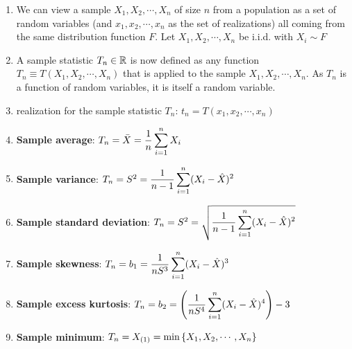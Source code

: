\begin{enumerate}
    \item We can view a sample $X_1 , X_2 , \cdots, X _n$ of size $n$ from a population as a set of random variables (and $x_1 , x_2, \cdots , x _n$ as the set of realizations) all coming from the same distribution function $F$.
    Let $X_1 , X_2, \cdots , X _n$ be i.i.d. with $X _i \sim F$
    \hfill \cite{statistics/book/Statistics-for-Data-Scientists/Maurits-Kaptein}

    \item A sample statistic $T_n \in \mathbb{R}$ is now defined as any function $T_n \equiv T (X_1, X_2, \cdots , X _n )$ that is applied to the sample $X_1 , X_2, \cdots , X _n$.
    As $T_n$ is a function of random variables, it is itself a random variable.
    \hfill \cite{statistics/book/Statistics-for-Data-Scientists/Maurits-Kaptein}

    \item realization for the sample statistic $T_n$: $t _n = T (x_1, x_2, \cdots , x _n )$
    \hfill \cite{statistics/book/Statistics-for-Data-Scientists/Maurits-Kaptein}

    \item \textbf{Sample average}: $T_n = \bar{X} = \dfrac{1}{n}\displaystyle\sum^n _{i=1} X _i$
    \hfill \cite{statistics/book/Statistics-for-Data-Scientists/Maurits-Kaptein}

    \item \textbf{Sample variance}: $T_n = S^2 = \dfrac{1}{n - 1} \displaystyle\sum^n _{i=1}(X _i - \hat{X})^2$
    \hfill \cite{statistics/book/Statistics-for-Data-Scientists/Maurits-Kaptein}

    \item \textbf{Sample standard deviation}: $T_n = S^2 = \sqrt{\dfrac{1}{n - 1} \displaystyle\sum^n _{i=1}(X _i - \hat{X})^2}$
    \hfill \cite{statistics/book/Statistics-for-Data-Scientists/Maurits-Kaptein}

    \item \textbf{Sample skewness}: $T_n = b_1 = \dfrac{1}{n S^3} \displaystyle\sum^n _{i=1} (X _i - \hat{X})^3$
    \hfill \cite{statistics/book/Statistics-for-Data-Scientists/Maurits-Kaptein}

    \item \textbf{Sample excess kurtosis}: $T_n = b_2 = \left(\dfrac{1}{n S^4} \displaystyle\sum^n _{i=1} (X _i - \hat{X})^4\right) - 3$
    \hfill \cite{statistics/book/Statistics-for-Data-Scientists/Maurits-Kaptein}

    \item \textbf{Sample minimum}: $T_n = X_{(1)} = \min \left\{X_1, X_2, \cdots, X _n \right\}$
    \hfill \cite{statistics/book/Statistics-for-Data-Scientists/Maurits-Kaptein}


\end{enumerate}
